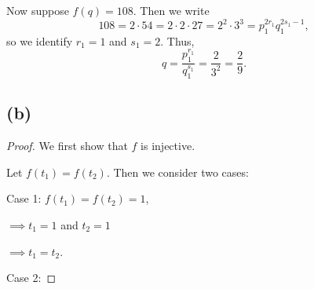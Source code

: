 \documentclass{article}
\begin{document}
Now suppose $f(q) = 108.$ Then we write
\begin{equation}
	108 = 2\cdot54 = 2\cdot2\cdot27 = 2^2 \cdot 3^3 = p_1^{2r_1}q_1^{2s_1 - 1},
\end{equation}
so we identify $r_1 = 1$ and $s_1=2$. Thus, 
\begin{equation}
	q = \frac{p_1^{r_1}}{q_1^{s_1}} = \frac{2}{3^2} = \frac{2}{9}.
\end{equation}

\subsection*{(b)}
\begin{proof}
	We first show that $f$ is injective.
	
	Let $f(t_1)=f(t_2)$. Then we consider two cases:
	
	Case 1: $f(t_1) = f(t_2) = 1$,
	
	$\implies t_1 = 1$ and $t_2 = 1$
	
	$\implies t_1 = t_2$.
	
	Case 2: 
\end{proof}
\end{document}
